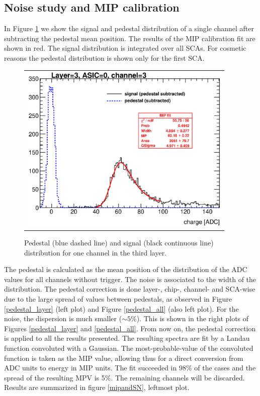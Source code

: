 \documentclass[a4paper,11pt]{article}
\begin{document}
\subsection{Noise study and MIP calibration}
\label{sec:calib}

In Figure \ref{signal_pedestal} we show the signal and pedestal distribution of a single channel after
subtracting the pedestal mean position. The results of the MIP calibration fit are shown in red.
The signal distribution is integrated over all SCAs.
For cosmetic reasons the pedestal distribution is shown only for the first SCA.


\begin{figure}[!ht]
  \centering
  \begin{tabular}{l}
    \includegraphics[width=4in]{../figs/mip_pedestal_example.eps}
  \end{tabular}
  \caption{Pedestal (blue dashed line) and signal (black continuous line) distribution for one channel in the third layer.}
\label{signal_pedestal}
\end{figure}

The pedestal is calculated as the mean position of
the distribution of the ADC values for all channels without trigger. The noise is
associated to the width of the distribution.
The pedestal correction is done layer-, chip-, channel- and SCA-wise due to the large spread of values between pedestals, as observed in 
Figure \ref{pedestal_layer} (left plot) and Figure \ref{pedestal_all} (also left plot).
For the noise, the dispersion is much smaller ($\sim 5 \%$). This is shown in the right plots of Figures \ref{pedestal_layer} and \ref{pedestal_all}.
From now on, the pedestal correction is applied to all the results presented.
The resulting spectra are fit by
a Landau function convoluted with a Gaussian.
The most-probable-value of the convoluted function is taken as the MIP value, allowing thus for a direct
conversion from ADC units to energy in MIP units.
The fit succeeded in 98\% of the cases and the spread of the resulting MPV is 5\%.
The remaining channels will be discarded. Results are summarized in figure \ref{mipandSN}, leftmost plot.
\end{document}
